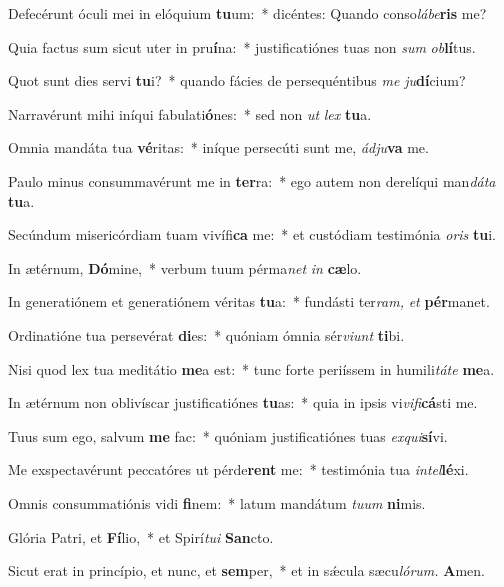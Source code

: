 \item Defecérunt óculi mei in elóquium \textbf{tu}um:~* dicéntes: Quando conso\textit{lábe}\textbf{ris} me?
\item Quia factus sum sicut uter in pru\textbf{í}na:~* justificatiónes tuas non \textit{sum} \textit{ob}\textbf{lí}tus.
\item Quot sunt dies servi \textbf{tu}i?~* quando fácies de persequéntibus \textit{me} \textit{ju}\textbf{dí}cium?
\item Narravérunt mihi iníqui fabulati\textbf{ó}nes:~* sed non \textit{ut} \textit{lex} \textbf{tu}a.
\item Omnia mandáta tua \textbf{vé}ritas:~* iníque persecúti sunt me, \textit{ádju}\textbf{va} me.
\item Paulo minus consummavérunt me in \textbf{ter}ra:~* ego autem non derelíqui man\tinyhspace\textit{dáta} \textbf{tu}a.
\item Secúndum misericórdiam tuam vivífi\textbf{ca} me:~* et custódiam testimónia \textit{oris} \textbf{tu}i.
\item In ætérnum, \textbf{Dó}mine,~* verbum tuum pérma\hspace*{0.01em}\textit{net} \textit{in} \textbf{cæ}lo.
\item In generatiónem et generatiónem véritas \textbf{tu}a:~* fundásti ter\textit{ram,} \textit{et} \textbf{pér}manet.
\item Ordinatióne tua persevérat \textbf{di}es:~* quóniam ómnia sér\textit{viunt} \textbf{ti}bi.
\item Nisi quod lex tua meditátio \textbf{me}a est:~* tunc forte periíssem in humili\textit{táte} \textbf{me}a.
\item In ætérnum non oblivíscar justificatiónes \textbf{tu}as:~* quia in i\-psis vi\textit{vifi}\textbf{cá}sti me.
\item Tuus sum ego, salvum \textbf{me} fac:~* quóniam justificatiónes tuas \textit{exqui}\textbf{sí}vi.
\item Me exspectavérunt peccatóres ut pérde\textbf{rent} me:~* testimónia tua \textit{intel}\textbf{lé}xi.
\item Omnis consummatiónis vidi \textbf{fi}nem:~* latum mandátum \textit{tuum} \textbf{ni}mis.
\item Glória Patri, et \textbf{Fí}lio,~* et Spirí\tinyhspace\textit{tui} \textbf{San}cto.
\item Sicut erat in princípio, et nunc, et \textbf{sem}per,~* et in sǽcula sæcu\tinyhspace\textit{lórum.} \textbf{A}men.
